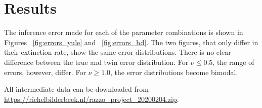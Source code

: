 \section{Results}

The inference error made for each of the parameter combinations
is shown in Figures ~\ref{fig:errors_yule} and ~\ref{fig:errors_bd}.
The two figures, that only differ in their extinction rate, 
show the same error distributions. There is no clear difference between
the true and twin error distribution. For $\nu \leqslant 0.5$, the
range of errors, however, differ. For $\nu \geq 1.0$, the error
distributions become bimodal. 

All intermediate data can be downloaded from \url{https://richelbilderbeek.nl/razzo_project_20200204.zip}.

